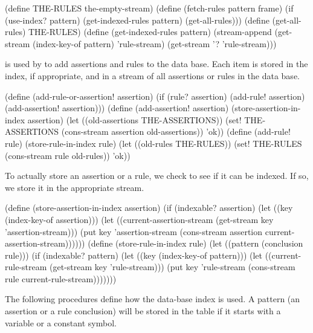 \begin{codeBlock}
(define THE-RULES the-empty-stream)
(define (fetch-rules pattern frame)
  (if (use-index? pattern)
      (get-indexed-rules pattern)
      (get-all-rules)))
(define (get-all-rules) THE-RULES)
(define (get-indexed-rules pattern)
  (stream-append
   (get-stream (index-key-of pattern) 'rule-stream)
   (get-stream '? 'rule-stream)))
\end{codeBlock}

\noindent
{} is used by  to add
assertions and rules to the data base.  Each item is stored in the index, if
appropriate, and in a stream of all assertions or rules in the data base.

\begin{codeBlock}
(define (add-rule-or-assertion! assertion)
  (if (rule? assertion)
      (add-rule! assertion)
      (add-assertion! assertion)))
(define (add-assertion! assertion)
  (store-assertion-in-index assertion)
  (let ((old-assertions THE-ASSERTIONS))
    (set! THE-ASSERTIONS
          (cons-stream assertion old-assertions))
    'ok))
(define (add-rule! rule)
  (store-rule-in-index rule)
  (let ((old-rules THE-RULES))
    (set! THE-RULES (cons-stream rule old-rules))
    'ok))
\end{codeBlock}

\noindent
To actually store an assertion or a rule, we check to see if it can be indexed.
If so, we store it in the appropriate stream.

\begin{codeBlock}
(define (store-assertion-in-index assertion)
  (if (indexable? assertion)
      (let ((key (index-key-of assertion)))
        (let ((current-assertion-stream
               (get-stream key 'assertion-stream)))
          (put key
               'assertion-stream
               (cons-stream
                assertion
                current-assertion-stream))))))
(define (store-rule-in-index rule)
  (let ((pattern (conclusion rule)))
    (if (indexable? pattern)
        (let ((key (index-key-of pattern)))
          (let ((current-rule-stream
                 (get-stream key 'rule-stream)))
            (put key
                 'rule-stream
                 (cons-stream rule
                              current-rule-stream)))))))
\end{codeBlock}

\noindent
The following procedures define how the data-base index is used.  A pattern (an
assertion or a rule conclusion) will be stored in the table if it starts with a
variable or a constant symbol.

